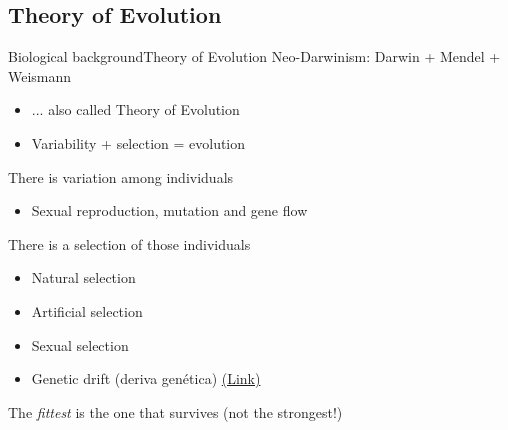 \documentclass[10pt,compress]{beamer} %
\begin{document}
\subsection{Theory of Evolution}
\begin{frame}{Biological background}{Theory of Evolution}
	Neo-Darwinism: Darwin + Mendel + Weismann
	\begin{itemize}
		\item ... also called Theory of Evolution
		\item Variability + selection = \alert{evolution}
	\end{itemize}
	There is variation among individuals
	\begin{itemize}
		\item Sexual reproduction, mutation and gene flow
  	\end{itemize}
	There is a selection of those individuals
	\begin{itemize}
		\item \alert{Natural selection}
		\item Artificial selection
		\item Sexual selection
		\item Genetic drift (deriva genética) \href{http://evolution.berkeley.edu/evolibrary/images/evo/beetles\_mech3.gif}{(Link)}
	\end{itemize}
	The \textit{fittest} is the one that survives (not the strongest!)
\end{frame}
\end{document}
